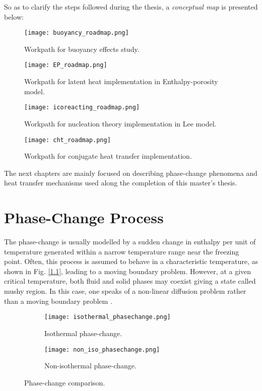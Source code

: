 So as to clarify the steps followed during the thesis, a \textit{conceptual map} is presented below:
\begin{figure}[h!]
	\centering
	\texttt{[image: buoyancy\_roadmap.png]}
	\caption{Workpath for buoyancy effects study.} 
	\label{1.1fig}
\end{figure}
\begin{figure}[h!]
	\centering
	\texttt{[image: EP\_roadmap.png]}
	\caption{Workpath for latent heat implementation in Enthalpy-porosity model.} 
	\label{1.2fig}
\end{figure}
\begin{figure}[h!]
	\centering
	\texttt{[image: icoreacting\_roadmap.png]}
	\caption{Workpath for nucleation theory implementation in Lee model.} 
	\label{1.3fig}
\end{figure}
\clearpage
\begin{figure}[h!]
	\centering
	\texttt{[image: cht\_roadmap.png]}
	\caption{Workpath for conjugate heat transfer implementation.} 
	\label{1.4fig}
\end{figure}

The next chapters are mainly focused on describing phase-change phenomena and heat transfer mechanisms used along the completion of this master's thesis.



\section{Phase-Change Process}
The phase-change is usually modelled by a sudden change in enthalpy per unit of temperature generated within a narrow temperature range near the freezing point. Often, this process is assumed to behave in a characteristic temperature, as shown in Fig. \ref{1.1}, leading to a moving boundary problem. However, at a given critical temperature, both fluid and solid phases may coexist giving a state called mushy region. In this case, one speaks of a non-linear diffusion problem rather than a moving boundary problem \cite{krabbenhoft_damkilde_nazem_2006}. 
 
\begin{figure}
	\begin{subfigure}{0.50\textwidth}
		\centering
		\texttt{[image: isothermal\_phasechange.png]}\hfill
		\caption{Isothermal phase-change.} 
		\label{1.5figa}
	\end{subfigure}
	\hfill
	\begin{subfigure}{0.50\textwidth}
		\centering
		\texttt{[image: non\_iso\_phasechange.png]}	
		\caption{Non-isothermal phase-change.}
		\label{1.5figb}
	\end{subfigure}
\caption{Phase-change comparison.}
\label{1.5fig}
\end{figure}

